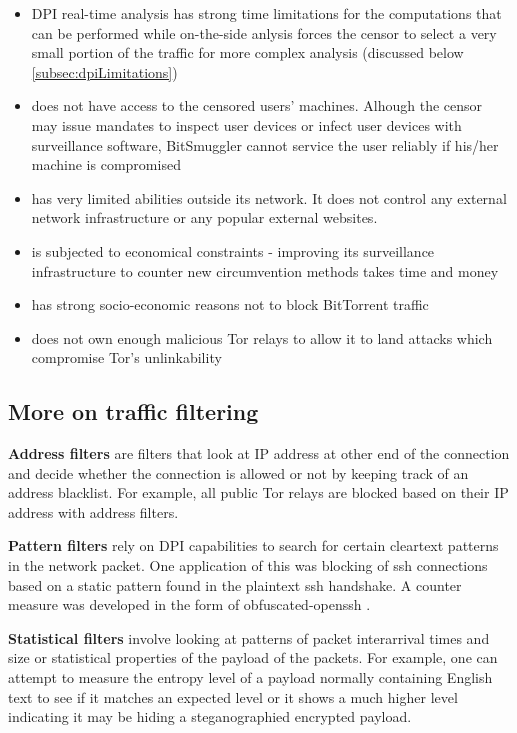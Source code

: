 \documentclass[11pt]{article} %
\newcommand{\projectName}{BitSmuggler }
\begin{document}
\begin{itemize}
\item DPI real-time analysis has strong time limitations for the computations that can be performed while on-the-side anlysis forces the censor to select a very small portion of the traffic for more complex analysis (discussed below  \ref{subsec:dpiLimitations}) 
\item does not have access to the censored users' machines. Alhough the censor may issue mandates to inspect user devices or infect user devices with surveillance software, \projectName cannot service the user reliably if his/her machine is compromised
\item has very limited abilities outside its network. It does not control any external network infrastructure or any popular external websites.
\item is subjected to economical constraints - improving its surveillance infrastructure to counter new circumvention methods takes time and money
\item has strong socio-economic reasons not to block BitTorrent traffic
\item does not own enough malicious Tor relays to allow it to land attacks which compromise Tor's unlinkability
\end{itemize}

\subsection{More on traffic filtering}
\label{subsec:trafficFiltering}

\textbf{Address filters} are filters that look at IP address at other end of the connection and decide whether the connection is allowed or not by keeping track of an address blacklist. For example, all public Tor relays are blocked based on their IP address with address filters.

\textbf{Pattern filters} rely on DPI capabilities to search for certain cleartext patterns in the network packet. One application of this was blocking of ssh connections based on a static pattern found in the plaintext ssh handshake. A counter measure was developed in the form of obfuscated-openssh \citep*{web:obfuscatedSSHRepo}.

\textbf{Statistical filters} involve looking at patterns of packet interarrival times and size or statistical properties of the payload of the packets. For example, one can attempt to measure the entropy level of a payload normally containing English text to see if it matches an expected level or it shows a much higher level indicating it may be hiding a steganographied encrypted payload.
\end{document}
